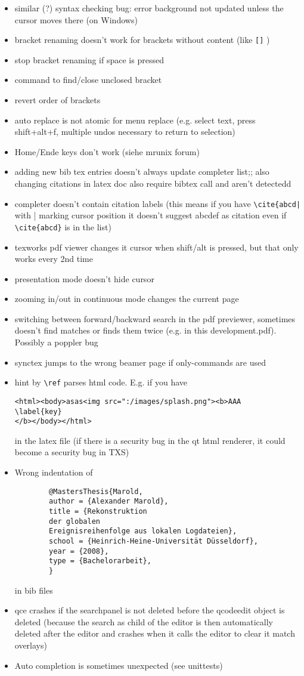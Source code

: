 \documentclass[10pt,a4paper,landscape]{report}
\begin{document}
\begin{itemize}
\item similar (?) syntax checking bug: error background not updated unless the cursor moves there (on Windows)
\item bracket renaming doesn't work for brackets without content (like \verb+[]+ )
\item stop bracket renaming if space is pressed
\item command to find/close unclosed bracket
\item revert order of brackets
\item auto replace is not atomic for menu replace (e.g. select text, press shift+alt+f, multiple undos necessary to return to selection)
\item Home/Ende keys don't work (siehe mrunix forum)
\item adding new bib tex entries doesn't always update completer list;; also changing citations in latex doc also require bibtex call and aren't detectedd
\item completer doesn't contain citation labels (this means if you have \verb+\cite{abcd|+ with | marking cursor position it doesn't suggest abcdef as citation even if \verb+\cite{abcd}+ is in the list)
\item texworks pdf viewer changes it cursor when shift/alt is pressed, but that only works every 2nd time
\item presentation mode doesn't hide cursor
\item zooming in/out in continuous mode changes the current page
\item switching between forward/backward search in the pdf previewer, sometimes doesn't find matches or finds them twice (e.g. in this development.pdf). Possibly a poppler bug
\item synctex jumps to the wrong beamer page if only-commands are used
\item hint by \verb+\ref+ parses html code. E.g. if you have \begin{verbatim}
<html><body>asas<img src=":/images/splash.png"><b>AAA
\label{key}
</b></body></html>
\end{verbatim} in the latex file (if there is a security bug in the qt html renderer, it could become a security bug in TXS)
	\item Wrong indentation of \begin{verbatim}
		@MastersThesis{Marold,
		author = {Alexander Marold},
		title = {Rekonstruktion 
		der globalen 
		Ereignisreihenfolge aus lokalen Logdateien},
		school = {Heinrich-Heine-Universität Düsseldorf},
		year = {2008},
		type = {Bachelorarbeit},
		}
	\end{verbatim} in bib files
	\item  qce crashes if the searchpanel is not deleted before the qcodeedit object is deleted (because the search as child of the editor is then automatically deleted after the editor and crashes when it calls the editor to clear it match overlays)
	\item  Auto completion is sometimes unexpected (see unittests)
\end{itemize} 
\end{document}
